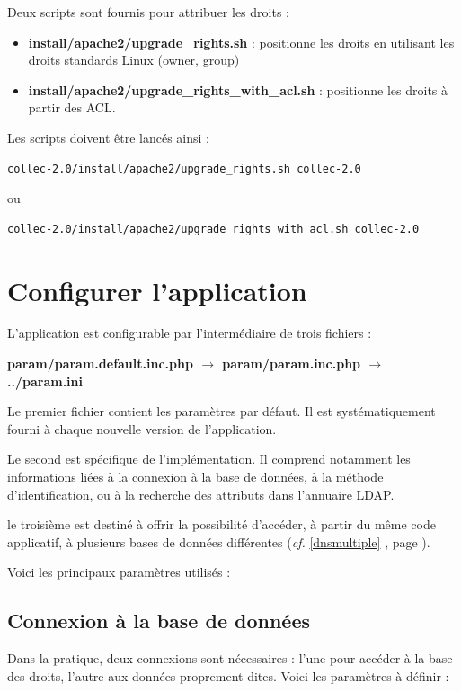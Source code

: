Deux scripts sont fournis pour attribuer les droits : 
\begin{itemize}
\item \textbf{install/apache2/upgrade\_rights.sh} : positionne les droits en utilisant les droits standards Linux (owner, group)
\item \textbf{install/apache2/upgrade\_rights\_with\_acl.sh} : positionne les droits à partir des ACL.
\end{itemize}

Les scripts doivent être lancés ainsi :
\begin{lstlisting}
collec-2.0/install/apache2/upgrade_rights.sh collec-2.0
\end{lstlisting}
ou 
\begin{lstlisting}
collec-2.0/install/apache2/upgrade_rights_with_acl.sh collec-2.0
\end{lstlisting}


\section{Configurer l'application}

L'application est configurable par l'intermédiaire de trois fichiers :

\textbf{param/param.default.inc.php $\rightarrow$ param/param.inc.php $\rightarrow$ ../param.ini}

Le premier fichier contient les paramètres par défaut. Il est systématiquement fourni à chaque nouvelle version de l'application.

Le second est spécifique de l'implémentation. Il comprend notamment les informations liées à la connexion à la base de données, à la méthode d'identification, ou à la recherche des attributs dans l'annuaire LDAP. 

le troisième est destiné à offrir la possibilité d'accéder, à partir du même code applicatif, à plusieurs bases de données différentes (\textit{cf.} \ref{dnsmultiple} \textit{}, page \pageref{dnsmultiple}).

Voici les principaux paramètres utilisés :

\subsection{Connexion à la base de données}

Dans la pratique, deux connexions sont nécessaires : l'une pour accéder à la base des droits, l'autre aux données proprement dites. Voici les paramètres à définir :

